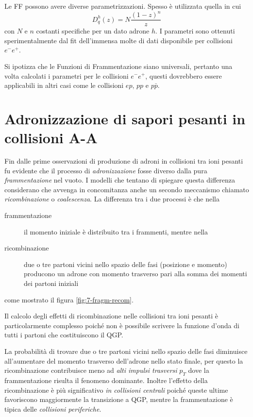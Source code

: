         Le FF possono avere diverse parametrizzazioni. Spesso è utilizzata quella in cui
        \begin{equation*}
            D_{q}^{h}(z) = N \frac{(1-z)^n}{z}
        \end{equation*}
        con $N$ e $n$ costanti specifiche per un dato adrone $h$. I parametri sono ottenuti sperimentalmente dal fit dell'immensa molte di dati disponibile per collisioni $e^{-} e^{+}$.

        Si ipotizza che le Funzioni di Frammentazione siano universali, pertanto una volta calcolati i parametri per le collisioni $e^{-} e^{+}$, questi dovrebbero essere applicabili in altri casi come le collisioni $ep$, $pp$ e $p\bar{p}$.

\section{Adronizzazione di sapori pesanti in collisioni A-A}
    Fin dalle prime osservazioni di produzione di adroni in collisioni tra ioni pesanti fu evidente che il processo di \textit{adronizzazione} fosse diverso dalla pura \textit{frammentazione} nel vuoto. I modelli che tentano di spiegare questa differenza considerano che avvenga in concomitanza anche un secondo meccanismo chiamato \textit{ricombinazione} o \textit{coalescenza}. La differenza tra i due processi è che nella
    \begin{description}
        \item[frammentazione] il momento iniziale è distribuito tra i frammenti, mentre nella

        \item[ricombinazione] due o tre partoni vicini nello spazio delle fasi (posizione e momento) producono un adrone con momento trasverso pari alla somma dei momenti dei partoni iniziali
    \end{description}
    come mostrato il figura \ref{fig:7-fragm-recom}.

    Il calcolo degli effetti di ricombinazione nelle collisioni tra ioni pesanti è particolarmente complesso poiché non è possibile scrivere la funzione d'onda di tutti i partoni che costituiscono il QGP.

    La probabilità di trovare due o tre partoni vicini nello spazio delle fasi diminuisce all'aumentare del momento trasverso dell'adrone nello stato finale, per questo la ricombinazione contribuisce meno ad \textit{alti impulsi trasversi} $p_T$ dove la frammentazione risulta il fenomeno dominante. Inoltre l'effetto della ricombinazione è più significativo \textit{in collisioni centrali} poiché queste ultime favoriscono maggiormente la transizione a QGP, mentre la frammentazione è tipica delle \textit{collisioni periferiche}.

